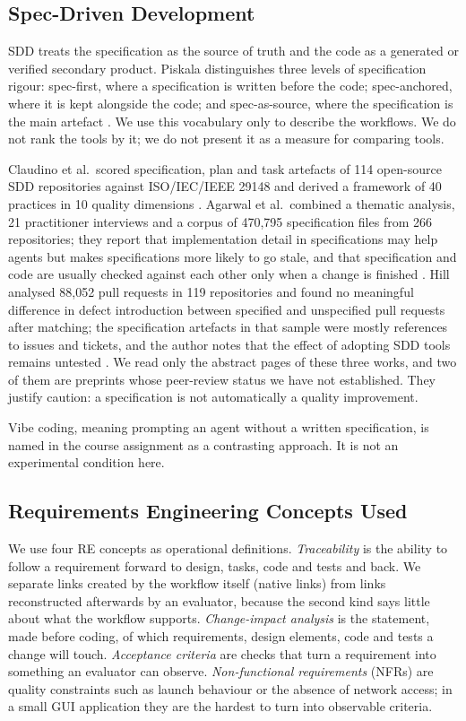 \documentclass[conference]{IEEEtran}
\begin{document}
\subsection{Spec-Driven Development}\label{spec-driven-development}

SDD treats the specification as the source of truth and the code as a
generated or verified secondary product. Piskala distinguishes three
levels of specification rigour: spec-first, where a specification is
written before the code; spec-anchored, where it is kept alongside the
code; and spec-as-source, where the specification is the main artefact
\cite{piskala2026}. We use this vocabulary only to describe the
workflows. We do not rank the tools by it; we do not present it as a
measure for comparing tools.

Claudino et al.~scored specification, plan and task artefacts of 114
open-source SDD repositories against ISO/IEC/IEEE 29148 and derived a
framework of 40 practices in 10 quality dimensions \cite{claudino2026}.
Agarwal et al.~combined a thematic analysis, 21 practitioner interviews
and a corpus of 470,795 specification files from 266 repositories; they
report that implementation detail in specifications may help agents but
makes specifications more likely to go stale, and that specification and
code are usually checked against each other only when a change is
finished \cite{agarwal2026}. Hill analysed 88,052 pull requests in 119
repositories and found no meaningful difference in defect introduction
between specified and unspecified pull requests after matching; the
specification artefacts in that sample were mostly references to issues
and tickets, and the author notes that the effect of adopting SDD tools
remains untested \cite{hill2026}. We read only the abstract pages of
these three works, and two of them are preprints whose peer-review
status we have not established. They justify caution: a specification is
not automatically a quality improvement.

Vibe coding, meaning prompting an agent without a written specification,
is named in the course assignment as a contrasting approach. It is not
an experimental condition here.

\subsection{Requirements Engineering Concepts
Used}\label{requirements-engineering-concepts-used}

We use four RE concepts as operational definitions. \emph{Traceability}
is the ability to follow a requirement forward to design, tasks, code
and tests and back. We separate links created by the workflow itself
(native links) from links reconstructed afterwards by an evaluator,
because the second kind says little about what the workflow supports.
\emph{Change-impact analysis} is the statement, made before coding, of
which requirements, design elements, code and tests a change will touch.
\emph{Acceptance criteria} are checks that turn a requirement into
something an evaluator can observe. \emph{Non-functional requirements}
(NFRs) are quality constraints such as launch behaviour or the absence
of network access; in a small GUI application they are the hardest to
turn into observable criteria.
\end{document}
